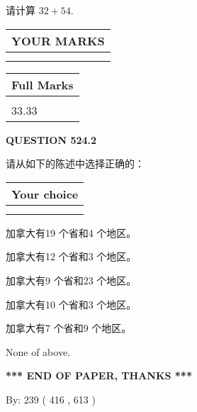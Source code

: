 \documentclass{ctexart}
\begin{document}
  
 
请计算 $ %
32 +  %
54 $.
 

 

 
  
\vspace{0.2in}
  
\noindent\begin{tabular}{|l|}
\hline
 YOUR MARKS  \\
\hline
 \\ 
 \\ 
\hline
\end{tabular}
\hspace{0.05in} \begin{tabular}{|l|}
\hline
 Full Marks  \\
\hline
 \\ 
33.33 \\
\hline
\end{tabular}
{\textbf{\Large{QUESTION
524.2 
}}}
  
  
请从如下的陈述中选择正确的：
  
  
\noindent\hspace{3.0in} \begin{tabular}{|l|}
\hline
Your choice \\
\hline
 \\ 
 \\ 
\hline
\end{tabular}
  
  
 
 
加拿大有19 个省和4 个地区。
 
 
加拿大有12 个省和3 个地区。
 
 
加拿大有9 个省和23 个地区。
 
 
加拿大有10 个省和3 个地区。
 
 
加拿大有7 个省和9 个地区。
 
 
 None of above.
 
 
   
   
 \vspace{0.2in}
 
   
   
   
   
\vspace{1.0in} 
{\textbf{\large{ *** END OF PAPER, THANKS *** }}} 
   
   
\hspace{1.0in} By: 
 239 ( 416 ,  613 )
   
\end{document}
